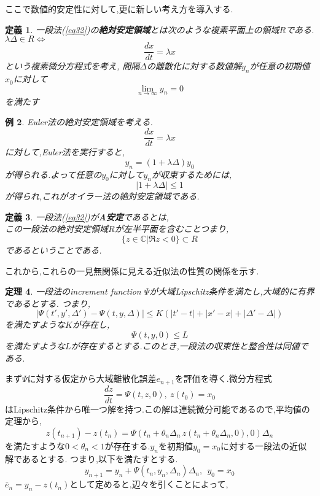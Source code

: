 \documentclass[a4paper]{jreport}
\def\qedsymbol{$\square$}
\def\proofname{\gt{証明}\;}
\newenvironment{Proof}{\par\noindent{\it\proofname}}{{\unskip\nobreak\hfill{\it\qedsymbol}}\par\vskip 9pt}
\numberwithin{equation}{section}
\newtheorem{Thm}     {定理}[section]
\newtheorem{Def}     [Thm]{定義}
\newtheorem{Ex}      [Thm]{例}
\renewenvironment{leftbar}{%
  \def\FrameCommand{\vrule width 1pt \hspace{10pt}}%
  \MakeFramed {\advance\hsize-\width \FrameRestore}}%
 {\endMakeFramed}
\def\C{\mathbb C}
\def\iff{\Leftrightarrow}
\def\thm{\begin{leftbar}\begin{Thm}}
\def\thmx{\end{Thm}\end{leftbar}}
\def\defb{\begin{leftbar}\begin{Def}}
\def\defx{\end{Def}\end{leftbar}}
\def\ex{\begin{Ex}}
\def\exx{\end{Ex}}
\def\proof{\begin{Proof}}
\begin{document}
ここで数値的安定性に対して,更に新しい考え方を導入する.
\defb
一段法(\ref{eq32})の{\bf 絶対安定領域}とは次のような複素平面上の領域$R$である.
\\
$\lambda \Delta \in R \iff $
\[
\frac{dx}{dt} = \lambda x
\]
という複素微分方程式を考え,
間隔$\Delta$の離散化に対する数値解$y_n$が任意の初期値$x_0$に対して
\[
\lim_{n\to\infty} y_n = 0
\]
を満たす
\defx
\ex
Euler法の絶対安定領域を考える.\\
\[
\frac{dx}{dt} = \lambda x
\]
に対して,Euler法を実行すると,\\
\[
y_n = (1+\lambda\Delta)y_0
\]
が得られる.よって任意の$y_0$に対して$y_n$が収束するためには,
\[
|1+\lambda\Delta| \le 1
\]
が得られ,これがオイラー法の絶対安定領域である.
\exx
\defb
一段法(\ref{eq32})が{\bf A安定}であるとは,\\
この一段法の絶対安定領域$R$が左半平面を含むことつまり,
\[
\{z \in \C | \Re z < 0 \} \subset R
\]
であるということである.
\defx
これから,これらの一見無関係に見える近似法の性質の関係を示す.
\thm
一段法のincrement function $\Psi$が大域Lipschitz条件を満たし,大域的に有界であるとする.
つまり,
\[
|\Psi(t',y',\Delta') -\Psi(t,y,\Delta)| \le K (|t'-t| + |x'-x| + |\Delta' - \Delta|)
\]
を満たすような$K$が存在し,
\[
\Psi(t,y,0) \le L
\]
を満たすような$L$が存在するとする.このとき,一段法の収束性と整合性は同値である.
\thmx
\proof
まず$\Psi$に対する仮定から大域離散化誤差$e_{n+1}$を評価を導く.微分方程式
\[
\frac{dz}{dt} = \Psi(t,z,0) ,\ z(t_0) = x_0
\]
はLipschitz条件から唯一つ解を持つ.この解は連続微分可能であるので,平均値の定理から,
\[
z(t_{n+1}) - z(t_n) = \Psi(t_n+\theta_n\Delta_n \,z(t_n+\theta_n\Delta_n,0),0) \Delta_n
\]
を満たすような$0 < \theta_n < 1$が存在する.$y_n$を初期値$y_0 = x_0$に対する一段法の近似解であるとする.
つまり,以下を満たすとする.
\[
y_{n+1} = y_n + \Psi(t_n,y_n,\Delta_n) \Delta_n,\  \  y_0 = x_0
\]
$\bar{e}_{n} = y_n - z(t_n)$として定めると,辺々を引くことによって,
\end{document}
